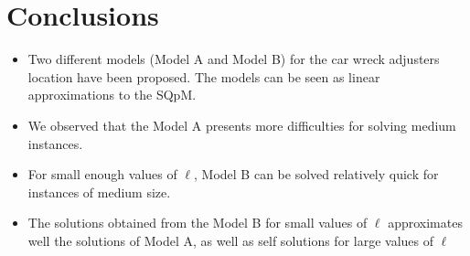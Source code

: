\chapter{Conclusions}
\label{ch:Conclusions}
\begin{itemize}
\item Two different models (Model A and Model B)
  for the car wreck adjusters location have been proposed. 
  The models can be seen as linear approximations to the SQpM.
\item We observed that the Model A
  presents more difficulties for solving medium instances.
\item For small enough values of $\ell$,
  Model B can be solved relatively quick
  for instances of medium size.
\item The solutions obtained from the Model B
  for small values of $\ell$
  approximates well the solutions of Model A,
  as well as self solutions for large values of $\ell$
\end{itemize}


